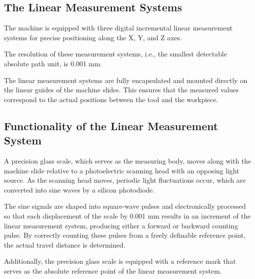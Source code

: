 

\subsection*{The Linear Measurement Systems}
The machine is equipped with three digital incremental linear measurement systems for precise positioning along the X, Y, and Z axes.\footnotemark[1]

The resolution of these measurement systems, i.e., the smallest detectable absolute path unit, is 0.001 mm.

The linear measurement systems are fully encapsulated and mounted directly on the linear guides of the machine slides. This ensures that the measured values correspond to the actual positions between the tool and the workpiece.


\subsection*{Functionality of the Linear Measurement System}
A precision glass scale, which serves as the measuring body, moves along with the machine slide relative to a photoelectric scanning head with an opposing light source. As the scanning head moves, periodic light fluctuations occur, which are converted into sine waves by a silicon photodiode.

The sine signals are shaped into square-wave pulses and electronically processed so that each displacement of the scale by 0.001 mm results in an increment of the linear measurement system, producing either a forward or backward counting pulse. By correctly counting these pulses from a freely definable reference point, the actual travel distance is determined.

Additionally, the precision glass scale is equipped with a reference mark that serves as the absolute reference point of the linear measurement system.

